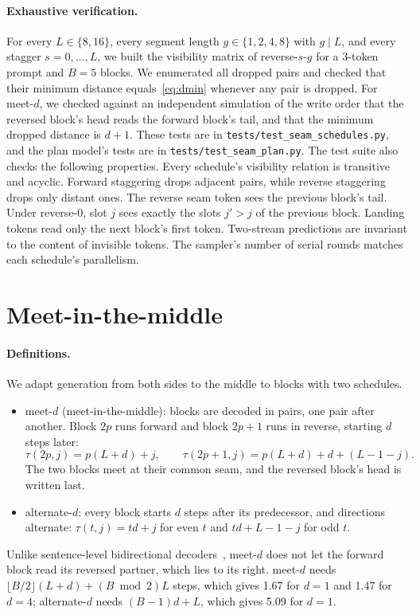 \documentclass[11pt]{article}
\theoremstyle{definition}
\theoremstyle{remark}
\newcommand{\sch}[1]{\textsf{#1}}
\begin{document}
\paragraph{Exhaustive verification.}
For every $L\in\{8,16\}$, every segment length $g\in\{1,2,4,8\}$ with $g\mid L$, and every stagger $s=0,\dots,L$, we built the visibility matrix of \sch{reverse-$s$-$g$} for a 3-token prompt and $B=5$ blocks.
We enumerated all dropped pairs and checked that their minimum distance equals~\eqref{eq:dmin} whenever any pair is dropped.
For \sch{meet-$d$}, we checked against an independent simulation of the write order that the reversed block's head reads the forward block's tail, and that the minimum dropped distance is $d+1$.
These tests are in \texttt{tests/test\_seam\_schedules.py}, and the plan model's tests are in \texttt{tests/test\_seam\_plan.py}.
The test suite also checks the following properties.
Every schedule's visibility relation is transitive and acyclic.
Forward staggering drops adjacent pairs, while reverse staggering drops only distant ones.
The reverse seam token sees the previous block's tail.
Under \sch{reverse-0}, slot $j$ sees exactly the slots $j'>j$ of the previous block.
Landing tokens read only the next block's first token.
Two-stream predictions are invariant to the content of invisible tokens.
The sampler's number of serial rounds matches each schedule's parallelism.

\section{Meet-in-the-middle}
\label{app:meet}

\paragraph{Definitions.}
We adapt generation from both sides to the middle to blocks with two schedules.
\begin{itemize}
  \item \sch{meet-$d$} (meet-in-the-middle): blocks are decoded in pairs, one pair after another. Block $2p$ runs forward and block $2p+1$ runs in reverse, starting $d$ steps later:
  \begin{equation}
    \tau(2p,j)=p(L+d)+j,\qquad \tau(2p+1,j)=p(L+d)+d+(L-1-j).
    \label{eq:meet}
  \end{equation}
  The two blocks meet at their common seam, and the reversed block's head is written last.
  \item \sch{alternate-$d$}: every block starts $d$ steps after its predecessor, and directions alternate: $\tau(t,j)=td+j$ for even $t$ and $td+L-1-j$ for odd $t$.
\end{itemize}
Unlike sentence-level bidirectional decoders~\citep{zhou2019sbnmt,zhang2020interleaved}, \sch{meet-$d$} does not let the forward block read its reversed partner, which lies to its right.
\sch{meet-$d$} needs $\lfloor B/2\rfloor(L+d)+(B\bmod 2)L$ steps, which gives 1.67 for $d=1$ and 1.47 for $d=4$; \sch{alternate-$d$} needs $(B-1)d+L$, which gives 5.09 for $d=1$.
\end{document}
